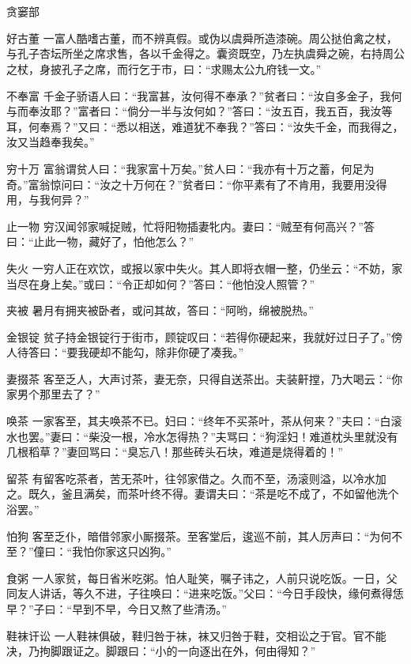 \documentclass[12pt,UTF8]{ctexbook}
\begin{document}
\part{}
贪窭部

好古董
一富人酷嗜古董，而不辨真假。或伪以虞舜所造漆碗。周公挞伯禽之杖，与孔子杏坛所坐之席求售，各以千金得之。囊资既空，乃左执虞舜之碗，右持周公之杖，身披孔子之席，而行乞于市，曰：“求赐太公九府钱一文。”

不奉富
千金子骄语人曰：“我富甚，汝何得不奉承？”贫者曰：“汝自多金子，我何与而奉汝耶？”富者曰：“倘分一半与汝何如？”答曰：“汝五百，我五百，我汝等耳，何奉焉？”又曰：“悉以相送，难道犹不奉我？”答曰：“汝失千金，而我得之，汝又当趋奉我矣。”

穷十万
富翁谓贫人曰：“我家富十万矣。”贫人曰：“我亦有十万之蓄，何足为奇。”富翁惊问曰：“汝之十万何在？”贫者曰：“你平素有了不肯用，我要用没得用，与我何异？”

止一物
穷汉闻邻家喊捉贼，忙将阳物插妻牝内。妻曰：“贼至有何高兴？”答曰：“止此一物，藏好了，怕他怎么？”

失火
一穷人正在欢饮，或报以家中失火。其人即将衣帽一整，仍坐云：“不妨，家当尽在身上矣。”或曰：“令正却如何？”答曰：“他怕没人照管？”

夹被
暑月有拥夹被卧者，或问其故，答曰：“阿哟，绵被脱热。”

金银锭
贫子持金银锭行于街市，顾锭叹曰：“若得你硬起来，我就好过日子了。”傍人待答曰：“要我硬却不能勾，除非你硬了凑我。”

妻掇茶
客至乏人，大声讨茶，妻无奈，只得自送茶出。夫装鼾摚，乃大喝云：“你家男个那里去了？”

唤茶
一家客至，其夫唤茶不已。妇曰：“终年不买茶叶，茶从何来？”夫曰：“白滚水也罢。”妻曰：“柴没一根，冷水怎得热？”夫骂曰：“狗淫妇！难道枕头里就没有几根稻草？”妻回骂曰：“臭忘八！那些砖头石块，难道是烧得着的！”

留茶
有留客吃茶者，苦无茶叶，往邻家借之。久而不至，汤滚则溢，以冷水加之。既久，釜且满矣，而茶叶终不得。妻谓夫曰：“茶是吃不成了，不如留他洗个浴罢。”

怕狗
客至乏仆，暗借邻家小厮掇茶。至客堂后，逡巡不前，其人厉声曰：“为何不至？”僮曰：“我怕你家这只凶狗。”

食粥
一人家贫，每日省米吃粥。怕人耻笑，嘱子讳之，人前只说吃饭。一日，父同友人讲话，等久不进，子往唤曰：“进来吃饭。”父曰：“今日手段快，缘何煮得恁早？”子曰：“早到不早，今日又熬了些清汤。”

鞋袜讦讼
一人鞋袜俱破，鞋归咎于袜，袜又归咎于鞋，交相讼之于官。官不能决，乃拘脚跟证之。脚跟曰：“小的一向逐出在外，何由得知？”
\end{document}
